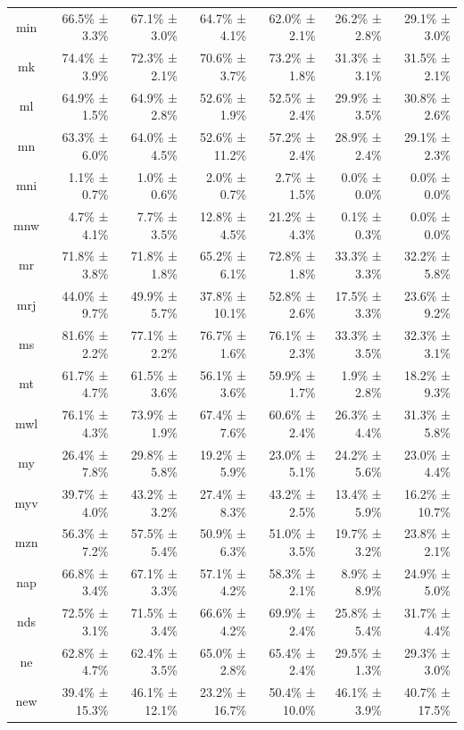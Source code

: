 \documentclass[10pt, a4paper]{article}
\begin{document}
\begin{table}[h]
\begin{tabular}{crrrrrr}
min & 66.5\% ± 3.3\% & 67.1\% ± 3.0\% & 64.7\% ± 4.1\% & 62.0\% ± 2.1\% & 26.2\% ± 2.8\% & 29.1\% ± 3.0\% \\
mk & 74.4\% ± 3.9\% & 72.3\% ± 2.1\% & 70.6\% ± 3.7\% & 73.2\% ± 1.8\% & 31.3\% ± 3.1\% & 31.5\% ± 2.1\% \\
ml & 64.9\% ± 1.5\% & 64.9\% ± 2.8\% & 52.6\% ± 1.9\% & 52.5\% ± 2.4\% & 29.9\% ± 3.5\% & 30.8\% ± 2.6\% \\
mn & 63.3\% ± 6.0\% & 64.0\% ± 4.5\% & 52.6\% ± 11.2\% & 57.2\% ± 2.4\% & 28.9\% ± 2.4\% & 29.1\% ± 2.3\% \\
mni & 1.1\% ± 0.7\% & 1.0\% ± 0.6\% & 2.0\% ± 0.7\% & 2.7\% ± 1.5\% & 0.0\% ± 0.0\% & 0.0\% ± 0.0\% \\
mnw & 4.7\% ± 4.1\% & 7.7\% ± 3.5\% & 12.8\% ± 4.5\% & 21.2\% ± 4.3\% & 0.1\% ± 0.3\% & 0.0\% ± 0.0\% \\
mr & 71.8\% ± 3.8\% & 71.8\% ± 1.8\% & 65.2\% ± 6.1\% & 72.8\% ± 1.8\% & 33.3\% ± 3.3\% & 32.2\% ± 5.8\% \\
mrj & 44.0\% ± 9.7\% & 49.9\% ± 5.7\% & 37.8\% ± 10.1\% & 52.8\% ± 2.6\% & 17.5\% ± 3.3\% & 23.6\% ± 9.2\% \\
ms & 81.6\% ± 2.2\% & 77.1\% ± 2.2\% & 76.7\% ± 1.6\% & 76.1\% ± 2.3\% & 33.3\% ± 3.5\% & 32.3\% ± 3.1\% \\
mt & 61.7\% ± 4.7\% & 61.5\% ± 3.6\% & 56.1\% ± 3.6\% & 59.9\% ± 1.7\% & 1.9\% ± 2.8\% & 18.2\% ± 9.3\% \\
mwl & 76.1\% ± 4.3\% & 73.9\% ± 1.9\% & 67.4\% ± 7.6\% & 60.6\% ± 2.4\% & 26.3\% ± 4.4\% & 31.3\% ± 5.8\% \\
my & 26.4\% ± 7.8\% & 29.8\% ± 5.8\% & 19.2\% ± 5.9\% & 23.0\% ± 5.1\% & 24.2\% ± 5.6\% & 23.0\% ± 4.4\% \\
myv & 39.7\% ± 4.0\% & 43.2\% ± 3.2\% & 27.4\% ± 8.3\% & 43.2\% ± 2.5\% & 13.4\% ± 5.9\% & 16.2\% ± 10.7\% \\
mzn & 56.3\% ± 7.2\% & 57.5\% ± 5.4\% & 50.9\% ± 6.3\% & 51.0\% ± 3.5\% & 19.7\% ± 3.2\% & 23.8\% ± 2.1\% \\
nap & 66.8\% ± 3.4\% & 67.1\% ± 3.3\% & 57.1\% ± 4.2\% & 58.3\% ± 2.1\% & 8.9\% ± 8.9\% & 24.9\% ± 5.0\% \\
nds & 72.5\% ± 3.1\% & 71.5\% ± 3.4\% & 66.6\% ± 4.2\% & 69.9\% ± 2.4\% & 25.8\% ± 5.4\% & 31.7\% ± 4.4\% \\
ne & 62.8\% ± 4.7\% & 62.4\% ± 3.5\% & 65.0\% ± 2.8\% & 65.4\% ± 2.4\% & 29.5\% ± 1.3\% & 29.3\% ± 3.0\% \\
new & 39.4\% ± 15.3\% & 46.1\% ± 12.1\% & 23.2\% ± 16.7\% & 50.4\% ± 10.0\% & 46.1\% ± 3.9\% & 40.7\% ± 17.5\% \\

\end{tabular}
\end{table}
\end{document}
